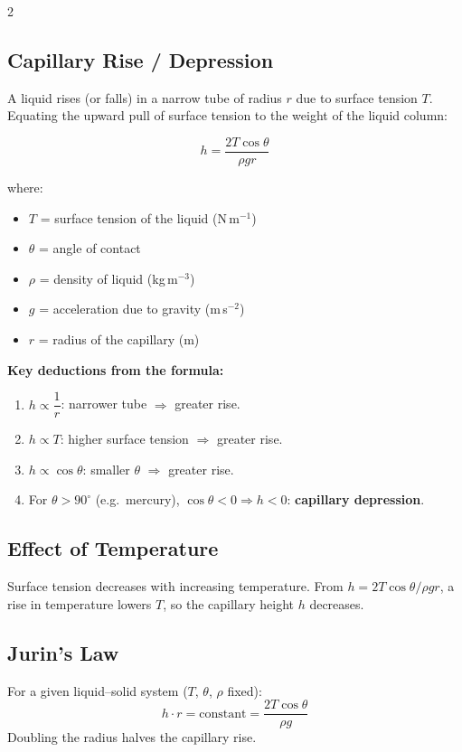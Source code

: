 \documentclass[12pt, a4paper]{exam}
\begin{document}
\begin{multicols}{2}
\subsection*{Capillary Rise / Depression}

A liquid rises (or falls) in a narrow tube of radius $r$ due to surface tension $T$. Equating the upward pull of surface tension to the weight of the liquid column:

\[
    h = \frac{2T\cos\theta}{\rho g r}
\]

where:
\begin{itemize}[leftmargin=*, itemsep=2pt]
    \item $T$ = surface tension of the liquid (N\,m$^{-1}$)
    \item $\theta$ = angle of contact
    \item $\rho$ = density of liquid (kg\,m$^{-3}$)
    \item $g$ = acceleration due to gravity (m\,s$^{-2}$)
    \item $r$ = radius of the capillary (m)
\end{itemize}

\textbf{Key deductions from the formula:}
\begin{enumerate}[leftmargin=*, itemsep=2pt]
    \item $h \propto \dfrac{1}{r}$: narrower tube $\Rightarrow$ greater rise.
    \item $h \propto T$: higher surface tension $\Rightarrow$ greater rise.
    \item $h \propto \cos\theta$: smaller $\theta$ $\Rightarrow$ greater rise.
    \item For $\theta > 90^\circ$ (e.g.\ mercury), $\cos\theta < 0 \Rightarrow h < 0$: \textbf{capillary depression}.
\end{enumerate}

\subsection*{Effect of Temperature}

Surface tension decreases with increasing temperature. From $h = 2T\cos\theta/\rho g r$, a rise in temperature lowers $T$, so the capillary height $h$ decreases.

\subsection*{Jurin's Law}

For a given liquid--solid system ($T$, $\theta$, $\rho$ fixed):
\[
    h \cdot r = \text{constant} = \frac{2T\cos\theta}{\rho g}
\]
Doubling the radius halves the capillary rise.

\end{multicols}
\end{document}
